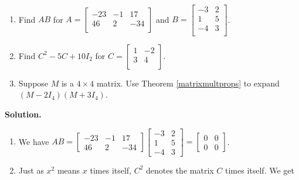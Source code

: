 \documentclass{ximera}
\begin{document}
\begin{example} \label{matrixmultex}  $~$

\begin{enumerate}

\item  Find $AB$ for $A = \left[ \begin{array}{rrr} -23 & -1 & 17 \\ 46 & 2 & -34 \\ \end{array} \right]$ and $B = \left[ \begin{array}{rr} -3 & 2 \\ 1 & 5 \\ -4 & 3 \\ \end{array} \right]$.


\item  Find $C^2 -5C + 10I_{2}$ for $C = \left[ \begin{array}{rr} 1 & -2 \\ 3 & 4 \\ \end{array} \right]$.

\item  Suppose $M$ is a $4 \times 4$ matrix.  Use Theorem \ref{matrixmultprops} to expand $\left(M - 2I_4\right)\left(M + 3I_4\right)$.


\end{enumerate}

{\bf Solution.}  

\begin{enumerate}

\item  We have $AB = \left[ \begin{array}{rrr} -23 & -1 & 17 \\ 46 & 2 & -34  \end{array} \right] \left[ \begin{array}{rr} -3 & 2 \\ 1 & 5 \\ -4 & 3  \end{array} \right] =  \left[ \begin{array}{rr} 0 & 0 \\ 0 & 0  \end{array} \right] $.


\item Just as $x^2$ means $x$ times itself, $C^2$ denotes the matrix $C$ times itself.  We get

\[ \begin{array}{rcl}


\end{array}\]
\end{enumerate}
\end{example}
\end{document}
